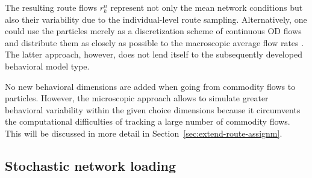 %
%
%
%

The resulting route flows $r_k^{n}$
represent not only the mean network conditions
but also their variability due to the individual-level
route sampling.
Alternatively, one could use the particles merely as a 
discretization scheme of continuous
OD flows and distribute them as closely as possible to the
macroscopic average flow rates \citep[e.g.,][]{zhang-2008}.
The latter approach, however, does not lend itself to
the subsequently developed behavioral model type.


No new behavioral dimensions are added when going from commodity
flows to particles. However, the microscopic approach allows
to simulate greater behavioral variability within the given
choice dimensions because it circumvents the computational
difficulties of tracking a large number of commodity flows.  This will
be discussed in more detail in Section~\ref{sec:extend-route-assignm}.


\subsection{Stochastic network loading}
\label{sec:stoch-netw-load}

